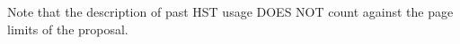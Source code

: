 \documentclass[12pt]{article}
\begin{document}

%
%
%
\pasthstusage  %
       Note that the description of past HST usage DOES NOT count against the page limits of the proposal.


\end{document}
